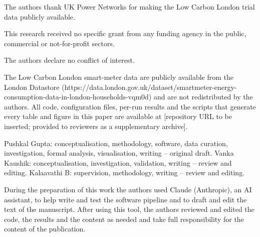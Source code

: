 \begin{declarations}
 The authors thank UK Power Networks for making the Low Carbon London trial data publicly available.

 This research received no specific grant from any funding agency in the public, commercial or not-for-profit sectors.

 The authors declare no conflict of interest.

 The Low Carbon London smart-meter data are publicly available from the London Datastore (https://data.london.gov.uk/dataset/smartmeter-energy-consumption-data-in-london-households-vqm0d) and are not redistributed by the authors. All code, configuration files, per-run results and the scripts that generate every table and figure in this paper are available at [repository URL to be inserted; provided to reviewers as a supplementary archive].

 Pushkal Gupta: conceptualisation, methodology, software, data curation, investigation, formal analysis, visualisation, writing -- original draft. Vanka Kaushik: conceptualisation, investigation, validation, writing -- review and editing. Kalaavathi B: supervision, methodology, writing -- review and editing.

 During the preparation of this work the authors used Claude (Anthropic), an AI assistant, to help write and test the software pipeline and to draft and edit the text of the manuscript. After using this tool, the authors reviewed and edited the code, the results and the content as needed and take full responsibility for the content of the publication.
\end{declarations}
